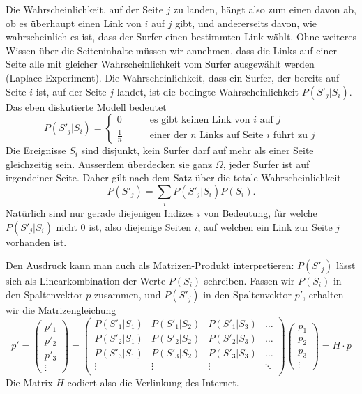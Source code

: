 Die Wahrscheinlichkeit, auf der Seite $j$ zu landen,
hängt also zum einen davon ab, ob es überhaupt
einen Link von $i$ auf $j$ gibt, und andererseits davon, wie wahrscheinlich
es ist, dass der Surfer einen bestimmten Link wählt.
Ohne weiteres Wissen über die Seiteninhalte müssen wir
annehmen, dass die Links auf einer Seite alle mit gleicher Wahrscheinlichkeit
vom Surfer ausgewählt werden (Laplace-Experiment).
Die Wahrscheinlichkeit, dass ein Surfer, der bereits
auf Seite $i$ ist, auf der Seite $j$ landet, ist die bedingte Wahrscheinlichkeit
$P(S'_j|S_i)$.
Das eben diskutierte Modell bedeutet
\[
P(S'_j|S_i)=\begin{cases}
0&\qquad\text{es gibt keinen Link von $i$ auf $j$}\\
\displaystyle\frac1n&\qquad\text{einer der $n$ Links auf Seite $i$ führt zu $j$}
\end{cases}
\]
Die Ereignisse $S_i$ sind disjunkt, kein Surfer darf auf mehr als einer
Seite gleichzeitig sein.
Ausserdem überdecken sie ganz $\Omega$, jeder Surfer ist auf irgendeiner
Seite.
Daher gilt nach dem Satz über die totale Wahrscheinlichkeit
\[
P(S'_j)=\sum_{i}P(S'_j|S_i)P(S_i).
\]
Natürlich sind nur gerade diejenigen Indizes $i$ von Bedeutung, für welche $P(S'_j|S_i)$
nicht $0$ ist, also diejenige Seiten $i$, auf welchen ein Link zur Seite $j$
vorhanden ist.

Den Ausdruck kann man auch als Matrizen-Produkt interpretieren: $P(S'_j)$ lässt sich
als Linearkombination der Werte $P(S_i)$ schreiben.
Fassen wir $P(S_i)$ in den Spaltenvektor
$p$ zusammen, und $P(S'_j)$ in den Spaltenvektor $p'$, erhalten wir die Matrizengleichung
\[
p'=
\left(\begin{matrix}p'_1\\p'_2\\p'_3\\\vdots\end{matrix}\right)
=
\left(\begin{matrix}
P(S'_1|S_1)&P(S'_1|S_2)&P(S'_1|S_3)&\dots\\
P(S'_2|S_1)&P(S'_2|S_2)&P(S'_2|S_3)&\dots\\
P(S'_3|S_1)&P(S'_3|S_2)&P(S'_3|S_3)&\dots\\
\vdots&\vdots&\vdots&\ddots\\
\end{matrix}\right)
\left(\begin{matrix}p_1\\p_2\\p_3\\\vdots\end{matrix}\right)
=
H\cdot p
\]
Die Matrix $H$ codiert also die Verlinkung des Internet.

